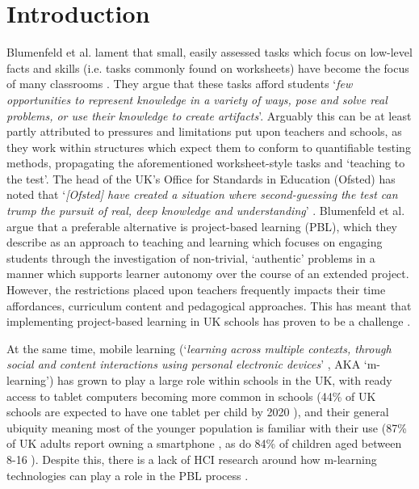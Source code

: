 \documentclass[,hyphens]{sigchi}
\def\plainkeywords{Mobile-Learning; Project-Based Learning; Digital Civics}
\begin{document}

\keywords{\plainkeywords}

\printccsdesc

\section{Introduction}

Blumenfeld et al. lament that small, easily assessed tasks which focus on low-level facts and skills (i.e. tasks commonly found on worksheets) have become the focus of many classrooms \cite{Blumenfeld1991}. They argue that these tasks afford students `\textit{few opportunities to represent knowledge in a variety of ways, pose and solve real problems, or use their knowledge to create artifacts}'. Arguably this can be at least partly attributed to pressures and limitations put upon teachers and schools, as they work within structures which expect them to conform to quantifiable testing methods, propagating the aforementioned worksheet-style tasks and `teaching to the test'. The head of the UK's Office for Standards in Education (Ofsted) has noted that `\textit{[Ofsted] have created a situation where second-guessing the test can trump the pursuit of real, deep knowledge and understanding}' \cite{Ofsted2018}. Blumenfeld et al. argue that a preferable alternative is project-based learning (PBL), which they describe as an approach to teaching and learning which focuses on engaging students through the investigation of non-trivial, `authentic' problems in a manner which supports learner autonomy over the course of an extended project. However, the restrictions placed upon teachers frequently impacts their time affordances, curriculum content and pedagogical approaches. This has meant that implementing project-based learning in UK schools has proven to be a challenge \cite{TheEducationEndowmentFoundation2016}.

At the same time, mobile learning (`\textit{learning across multiple contexts, through social and content interactions using personal electronic devices}' \cite{Crompton2013}, AKA `m-learning') has grown to play a large role within schools in the UK, with ready access to tablet computers becoming more common in schools (44\% of UK schools are expected to have one tablet per child by 2020 \cite{BritishEducationalSuppliersAssociation2015}), and their general ubiquity meaning most of the younger population is familiar with their use (87\% of UK adults report owning a smartphone \cite{Statistica2018}, as do 84\% of children aged between 8-16 \cite{Statistica2018a}). Despite this, there is a lack of HCI research around how m-learning technologies can play a role in the PBL process \cite{Chan2015}.
\end{document}
